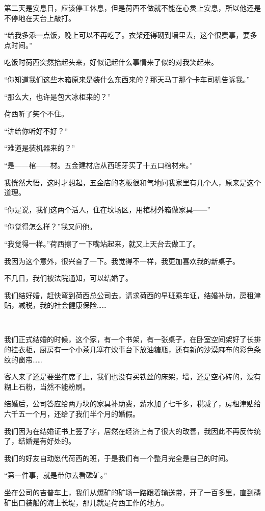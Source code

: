 \par 第二天是安息日，应该停工休息，但是荷西不做就不能在心灵上安息，所以他还是不停地在天台上敲打。
\par “给我多添一点饭，晚上可以不再吃了。衣架还得砌到墙里去，这个很费事，要多点时间。”
\par 吃饭时荷西突然抬起头来，好似记起什么事情来了似的对我笑起来。
\par “你知道我们这些木箱原来是装什么东西来的？那天马丁那个卡车司机告诉我。”
\par “那么大，也许是包大冰柜来的？”
\par 荷西听了笑个不住。
\par “讲给你听好不好？”
\par “难道是装机器来的？”
\par “是——棺——材。五金建材店从西班牙买了十五口棺材来。”
\par 我恍然大悟，这时才想起，五金店的老板很和气地问我家里有几个人，原来是这个道理。
\par “你是说，我们这两个活人，住在坟场区，用棺材外箱做家具——”
\par “你觉得怎么样？”我又问他。
\par “我觉得一样。”荷西擦了一下嘴站起来，就又上天台去做工了。
\par 我因为这个意外，很兴奋了一下。我觉得不一样，我更加喜欢我的新桌子。
\par 不几日，我们被法院通知，可以结婚了。
\par 我们结好婚，赶快弯到荷西总公司去，请求荷西的早班乘车证，结婚补助，房租津贴，减税，我的社会健康保险……
\par  
\par 我们正式结婚的时候，这个家，有一个书架，有一张桌子，在卧室空间架好了长排的挂衣柜，厨房有一个小茶几塞在炊事台下放油糖瓶，还有新的沙漠麻布的彩色条纹的窗帘……
\par 客人来了还是要坐在席子上，我们也没有买铁丝的床架，墙，还是空心砖的，没有糊上石粉，当然不能粉刷。
\par 结婚后，公司答应给两万块的家具补助费，薪水加了七千多，税减了，房租津贴给六千五一个月，还给了我们半个月的婚假。
\par 我们因为在结婚证书上签了字，居然在经济上有了很大的改善，我因此不再反传统了，结婚是有好处的。
\par 我们的好友自动愿代荷西的班，于是我们有一个整月完全是自己的时间。
\par “第一件事，就是带你去看磷矿。”
\par 坐在公司的吉普车上，我们从爆矿的矿场一路跟着输送带，开了一百多里，直到磷矿出口装船的海上长堤，那儿就是荷西工作的地方。
